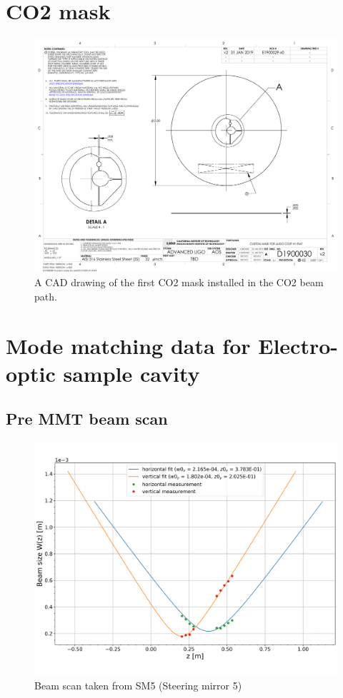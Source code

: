 \section{CO2 mask}\label{sec:CO2mask}
\begin{figure}[H]
\includegraphics[width=\textwidth]{figs/TCS/CO2mask/D1900030-v2.PDF}
\caption{A CAD drawing of the first CO2 mask installed in the CO2 beam path.}
\label{fig:co2mask1}
\end{figure}


\section{Mode matching data for Electro-optic sample cavity}

\subsection{Pre MMT beam scan}

\begin{figure}[H]
\includegraphics[width=\textwidth]{figs/ALGAAS/beam_scans/12_18_2020_preMMT.pdf}
\caption{Beam scan taken from SM5 (Steering mirror 5)}
\label{fig:beamscan2020}
\end{figure}

